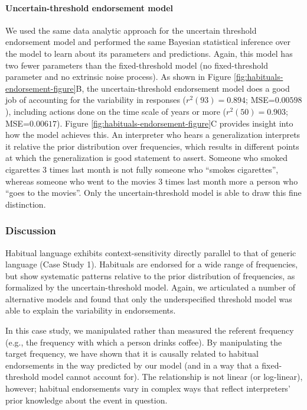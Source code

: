 \documentclass[english,floatsintext,man]{apa6}
\theoremstyle{definition}
\theoremstyle{definition}
\theoremstyle{definition}
\theoremstyle{remark}
\begin{document}
\paragraph{Uncertain-threshold endorsement
model}\label{uncertain-threshold-endorsement-model}

We used the same data analytic approach for the uncertain threshold
endorsement model and performed the same Bayesian statistical inference
over the model to learn about its parameters and predictions. Again,
this model has two fewer parameters than the fixed-threshold model (no
fixed-threshold parameter and no extrinsic noise process). As shown in
Figure \ref{fig:habituals-endorsement-figure}B, the uncertain-threshold
endorsement model does a good job of accounting for the variability in
responses (\(r^2(93) = 0.894\); MSE=\(0.00598\)), including actions done
on the time scale of years or more (\(r^2(50) = 0.903\);
MSE=\(0.00617\)). Figure \ref{fig:habituals-endorsement-figure}C
provides insight into how the model achieves this. An interpreter who
hears a generalization interprets it relative the prior distribution
over frequencies, which results in different points at which the
generalization is good statement to assert. Someone who smoked
cigarettes 3 times last month is not fully someone who \enquote{smokes
cigarettes}, whereas someone who went to the movies 3 times last month
more a person who \enquote{goes to the movies}. Only the
uncertain-threshold model is able to draw this fine distinction.

\subsubsection{Discussion}\label{discussion-1}

Habitual language exhibits context-sensitivity directly parallel to that
of generic language (Case Study 1). Habituals are endorsed for a wide
range of frequencies, but show systematic patterns relative to the prior
distribution of frequencies, as formalized by the uncertain-threshold
model. Again, we articulated a number of alternative models and found
that only the underspecified threshold model was able to explain the
variability in endorsements.

In this case study, we manipulated rather than measured the referent
frequency (e.g., the frequency with which a person drinks coffee). By
manipulating the target frequency, we have shown that it is causally
related to habitual endorsements in the way predicted by our model (and
in a way that a fixed-threshold model cannot account for). The
relationship is not linear (or log-linear), however; habitual
endorsements vary in complex ways that reflect interpreters' prior
knowledge about the event in question.
\end{document}
